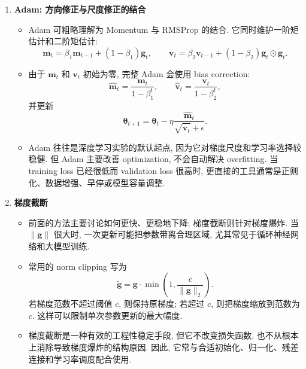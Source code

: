 \documentclass{../nndlcourse}
\begin{document}
\begin{enumerate}
\begin{itemize}
\[        =
        \boldsymbol{\theta}_t
        +
        \rho\Delta\boldsymbol{\theta}_{t-1},
        \qquad
        \Delta\boldsymbol{\theta}_t
        =
        \rho\Delta\boldsymbol{\theta}_{t-1}
        -
        \eta\nabla_{\boldsymbol{\theta}}
        \mathcal{L}(\hat{\boldsymbol{\theta}}_t).
      \]
      与普通 Momentum 相比, Nesterov 使用“预计会到达的位置”来估计梯度, 因而在某些情况下能更早修正过大的惯性方向.
    \end{itemize}
  \item \textbf{Adam: 方向修正与尺度修正的结合}
    \begin{itemize}
      \item Adam 可粗略理解为 Momentum 与 RMSProp 的结合. 它同时维护一阶矩估计和二阶矩估计:
      \[
        \boldsymbol{m}_t
        =
        \beta_1\boldsymbol{m}_{t-1}
        +
        (1-\beta_1)\boldsymbol{g}_t,
        \qquad
        \boldsymbol{v}_t
        =
        \beta_2\boldsymbol{v}_{t-1}
        +
        (1-\beta_2)\boldsymbol{g}_t\odot\boldsymbol{g}_t.
      \]
      \item 由于 $\boldsymbol{m}_t$ 和 $\boldsymbol{v}_t$ 初始为零, 完整 Adam 会使用 bias correction:
      \[
        \hat{\boldsymbol{m}}_t
        =
        \frac{\boldsymbol{m}_t}{1-\beta_1^t},
        \qquad
        \hat{\boldsymbol{v}}_t
        =
        \frac{\boldsymbol{v}_t}{1-\beta_2^t},
      \]
      并更新
      \[
        \boldsymbol{\theta}_{t+1}
        =
        \boldsymbol{\theta}_t
        -
        \eta
        \frac{\hat{\boldsymbol{m}}_t}
        {\sqrt{\hat{\boldsymbol{v}}_t}+\epsilon}.
      \]
      \item Adam 往往是深度学习实验的默认起点, 因为它对梯度尺度和学习率选择较稳健. 但 Adam 主要改善 optimization, 不会自动解决 overfitting. 当 training loss 已经很低而 validation loss 很高时, 更直接的工具通常是正则化、数据增强、早停或模型容量调整.
    \end{itemize}
  \item \textbf{梯度截断}
    \begin{itemize}
      \item 前面的方法主要讨论如何更快、更稳地下降; 梯度截断则针对梯度爆炸. 当 $\|\boldsymbol{g}\|$ 很大时, 一次更新可能把参数带离合理区域, 尤其常见于循环神经网络和大模型训练.
      \item 常用的 norm clipping 写为
      \[
        \tilde{\boldsymbol{g}}
        =
        \boldsymbol{g}\cdot
        \min\left(1, \frac{c}{\|\boldsymbol{g}\|_2}\right).
      \]
      若梯度范数不超过阈值 $c$, 则保持原梯度; 若超过 $c$, 则把梯度缩放到范数为 $c$. 这样可以限制单次参数更新的最大幅度.
      \item 梯度截断是一种有效的工程性稳定手段, 但它不改变损失函数, 也不从根本上消除导致梯度爆炸的结构原因. 因此, 它常与合适初始化、归一化、残差连接和学习率调度配合使用.
    \end{itemize}
\end{enumerate}
\end{document}
